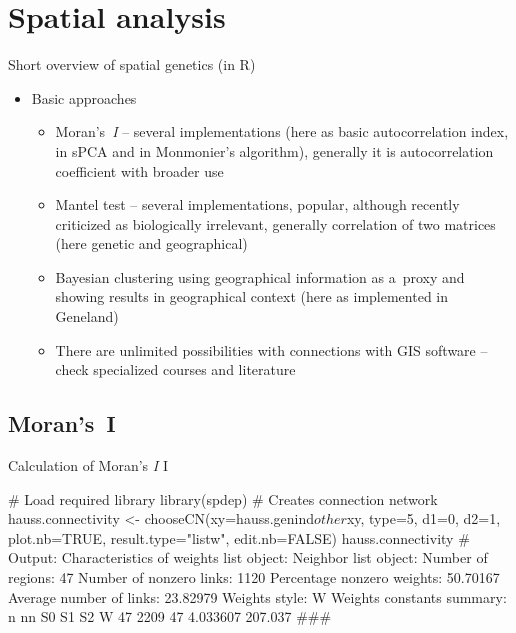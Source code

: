 \documentclass[compress, ucs, xelatex, 11pt, xcolor=svgnames,
  hyperref={
    bookmarks=true,
    unicode=true,
    colorlinks=true,
    pdftitle={Molecular data in R},
    plainpages=false,
    pdfauthor={Vojtech Zeisek},
    pdfsubject={Course about phylogeny and evolution in R},
    pdfcreator={XeLaTeX},
    pdfkeywords={R, evolution, phylogeny, molecular data},
    linkcolor=Tomato,
    anchorcolor=SaddleBrown,
    citecolor=Goldenrod,
    filecolor=DarkMagenta,
    menucolor=Sienna,
    urlcolor=DarkTurquoise,
    pdftex},
  url={hyphens, lowtilde} %
  ]{beamer}
\begin{document}
\section{Spatial analysis}

\begin{frame}{Short overview of spatial genetics (in R)}
\begin{itemize}
  \item Basic approaches
  \begin{itemize}
    \item Moran's~\textit{I} -- several implementations (here as basic autocorrelation index, in sPCA and in Monmonier's algorithm), generally it is autocorrelation coefficient with broader use
    \item Mantel test -- several implementations, popular, although recently criticized as biologically irrelevant, generally correlation of two matrices (here genetic and geographical)
    \item Bayesian clustering using geographical information as a~proxy and showing results in geographical context (here as implemented in Geneland)
    \item There are unlimited possibilities with connections with GIS software -- check specialized courses and literature
  \end{itemize}
\end{itemize}
\end{frame}

\subsection{Moran's~I}

\begin{frame}[fragile]{Calculation of Moran's \textit{I} I}
  \begin{spluscode}
    # Load required library
    library(spdep)
    # Creates connection network
    hauss.connectivity <- chooseCN(xy=hauss.genind$other$xy, type=5,
      d1=0, d2=1, plot.nb=TRUE, result.type="listw", edit.nb=FALSE)
    hauss.connectivity
    # Output:
    Characteristics of weights list object:
    Neighbor list object:
    Number of regions: 47
    Number of nonzero links: 1120
    Percentage nonzero weights: 50.70167
    Average number of links: 23.82979
    Weights style: W
    Weights constants summary:
       n   nn S0       S1      S2
    W 47 2209 47 4.033607 207.037
    ###
  \end{spluscode}
\end{frame}
\end{document}

